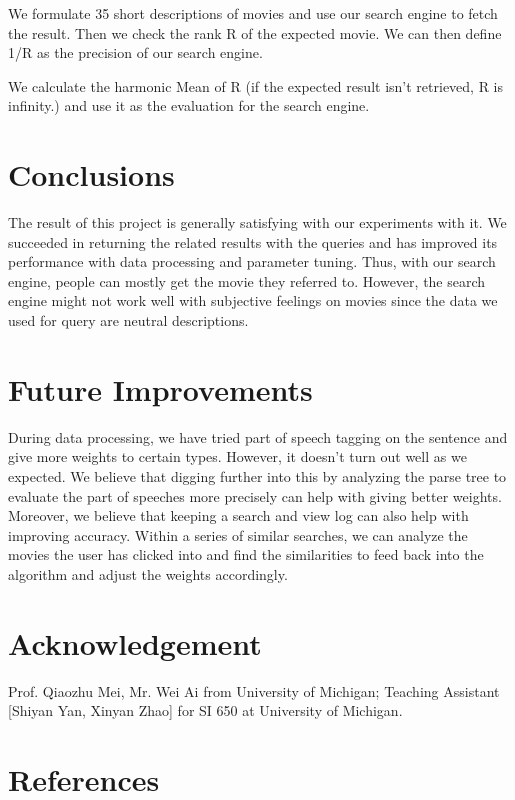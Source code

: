 \documentclass[letterpaper,10pt]{article}
\begin{document}
\begin{multicols}{2}
    We formulate 35 short descriptions of movies and use our search engine to fetch the result. Then we check the rank R of the expected movie. We can then define 1/R as the precision of our search engine.

    We calculate the harmonic Mean of R (if the expected result isn’t retrieved, R is infinity.) and use it as the evaluation for the search engine.

    \section{Conclusions}

    The result of this project is generally satisfying with our experiments with it. We succeeded in returning the related results with the queries and has improved its performance with data processing and parameter tuning. Thus, with our search engine, people can mostly get the movie they referred to. However, the search engine might not work well with subjective feelings on movies since the data we used for query are neutral descriptions.

    \section{Future Improvements}
    During data processing, we have tried part of speech tagging on the sentence and give more weights to certain types. However, it doesn’t turn out well as we expected. We believe that digging further into this by analyzing the parse tree to evaluate the part of speeches more precisely can help with giving better weights.
    Moreover, we believe that keeping a search and view log can also help with improving accuracy. Within a series of similar searches, we can analyze the movies the user has clicked into and find the similarities to feed back into the algorithm and adjust the weights accordingly.

    \section{Acknowledgement}

    Prof. Qiaozhu Mei, Mr. Wei Ai from University of Michigan;
    Teaching Assistant [Shiyan Yan, Xinyan Zhao] for SI 650 at University of Michigan.

    \section*{References}





\end{multicols}
\end{document}
